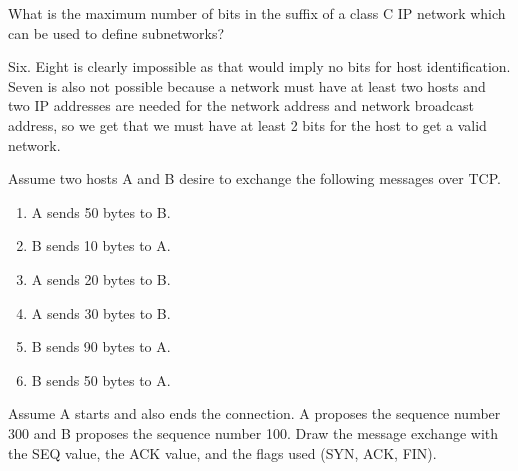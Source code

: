 \begin{Exercise}
What is the maximum number of bits in the suffix of a class C IP network which can be used to define subnetworks?
\end{Exercise}
\begin{Answer}
Six.
Eight is clearly impossible as that would imply no bits for host identification.
Seven is also not possible because a network must have at least two hosts and two IP addresses are needed for the network address and network broadcast address, so we get that we must have at least 2 bits for the host to get a valid network.
\end{Answer}

\begin{Exercise}
Assume two hosts A and B desire to exchange the following messages over TCP.

\begin{enumerate}
\item A sends 50 bytes to B.
\item B sends 10 bytes to A.
\item A sends 20 bytes to B.
\item A sends 30 bytes to B.
\item B sends 90 bytes to A.
\item B sends 50 bytes to A.
\end{enumerate}

Assume A starts and also ends the connection. A proposes the sequence number 300 and B proposes the sequence number 100. Draw the message exchange with the SEQ value, the ACK value, and the flags used (SYN, ACK, FIN).
\end{Exercise}

